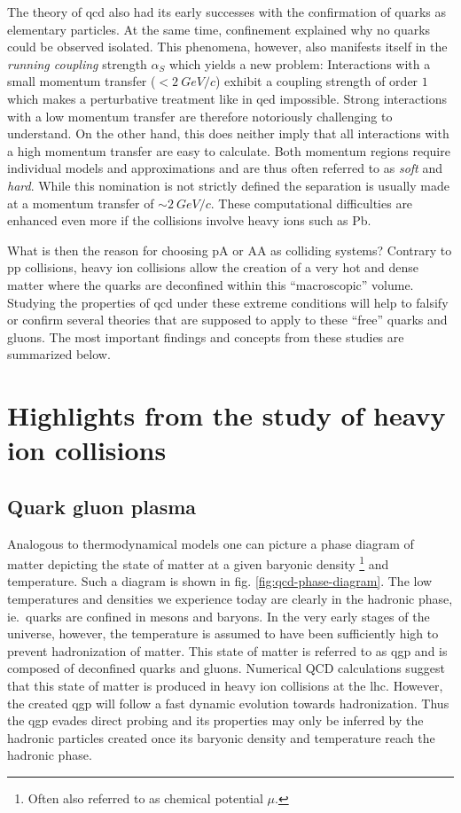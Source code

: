 The theory of \gls{qcd} also had its early successes with the confirmation of quarks as elementary particles. At the same time, confinement explained why no quarks could be observed isolated. This phenomena, however, also manifests itself in the \emph{running coupling} strength $\alpha_S$  which yields a new problem: Interactions with a small momentum transfer ($< \SI{2}{GeV/c}$) exhibit a coupling strength of order $1$ which makes a perturbative treatment like in \gls{qed} impossible. Strong interactions with a low momentum transfer are therefore notoriously challenging to understand. On the other hand, this does neither imply that all interactions with a high momentum transfer are easy to calculate. Both momentum regions require individual models and approximations and are thus often referred to as \emph{soft} and \emph{hard}. While this nomination is not strictly defined the separation is usually made at a momentum transfer of $\sim \SI{2}{GeV/c}$. These computational difficulties are enhanced even more if the collisions involve heavy ions such as \gls{Pb}. 

What is then the reason for choosing \gls{pA} or \gls{AA} as colliding systems? Contrary to \gls{pp} collisions, heavy ion collisions allow the creation of a very hot and dense matter where the quarks are deconfined within this ``macroscopic'' volume. Studying the properties of \gls{qcd} under these extreme conditions will help to falsify or confirm several theories that are supposed to apply to these ``free'' quarks and gluons. The most important findings and concepts from these studies are summarized below.

\section{Highlights from the study of heavy ion collisions}
\label{sec:important_results}

\subsection{Quark gluon plasma}
\label{sec:QGP}

Analogous to thermodynamical models one can picture a phase diagram of matter depicting the state of matter at a given baryonic density \footnote{Often also referred to as chemical potential $\mu$.} and temperature. Such a diagram is shown in fig. \ref{fig:qcd-phase-diagram}. The low temperatures and densities we experience today are clearly in the hadronic phase, ie.\ quarks are confined in mesons and baryons. In the very early stages of the universe, however, the temperature is assumed to have been sufficiently high to prevent hadronization of matter. This state of matter is referred to as \gls{qgp} and is composed of deconfined quarks and gluons. Numerical QCD calculations suggest that this state of matter is produced in heavy ion collisions at the \gls{lhc}. However, the created \gls{qgp} will follow a fast dynamic evolution towards hadronization. Thus the \gls{qgp} evades direct probing and its properties may only be inferred by the hadronic particles created once its  baryonic density and temperature reach the hadronic phase.

